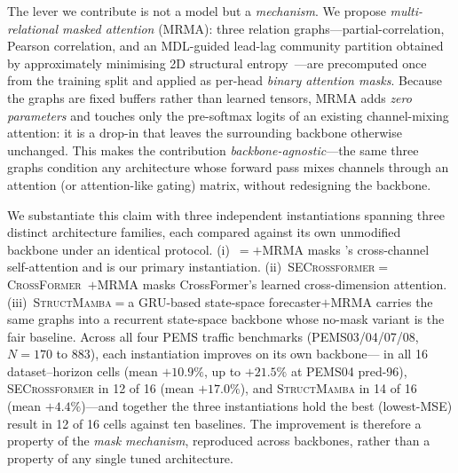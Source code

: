 %

The lever we contribute is not a model but a \emph{mechanism}.
We propose \emph{multi-relational masked attention} (MRMA): three relation
graphs---partial-correlation, Pearson correlation, and an MDL-guided lead-lag
community partition obtained by approximately minimising 2D structural
entropy~\cite{li2016structural}---are precomputed once from the training split
and applied as per-head \emph{binary attention masks}.
Because the graphs are fixed buffers rather than learned tensors, MRMA adds
\emph{zero parameters} and touches only the pre-softmax logits of an existing
channel-mixing attention: it is a drop-in that leaves the surrounding backbone
otherwise unchanged.
This makes the contribution \emph{backbone-agnostic}---the same three graphs
condition any architecture whose forward pass mixes channels through an
attention (or attention-like gating) matrix, without redesigning the backbone.

We substantiate this claim with three independent instantiations spanning three
distinct architecture families, each compared against its own unmodified
backbone under an identical protocol.
(i)~\mr{}${=}$\itrans{}${+}$MRMA masks \itrans{}'s cross-channel self-attention
and is our primary instantiation.
(ii)~\textsc{SECrossformer}${=}$\textsc{CrossFormer}~\cite{zhang2023crossformer}${+}$MRMA
masks CrossFormer's learned cross-dimension attention.
(iii)~\textsc{StructMamba}${=}$a GRU-based state-space forecaster${+}$MRMA
carries the same graphs into a recurrent state-space backbone whose no-mask
variant is the fair baseline.
Across all four PEMS traffic benchmarks (PEMS03/04/07/08, $N{=}170$ to $883$),
each instantiation improves on its own backbone---\mr{} in all 16
dataset--horizon cells (mean $+10.9\%$, up to $+21.5\%$ at PEMS04 pred-96),
\textsc{SECrossformer} in 12 of 16 (mean $+17.0\%$), and \textsc{StructMamba}
in 14 of 16 (mean $+4.4\%$)---and together the three instantiations hold the
best (lowest-MSE) result in 12 of 16 cells against ten baselines.
The improvement is therefore a property of the \emph{mask mechanism}, reproduced
across backbones, rather than a property of any single tuned architecture.

